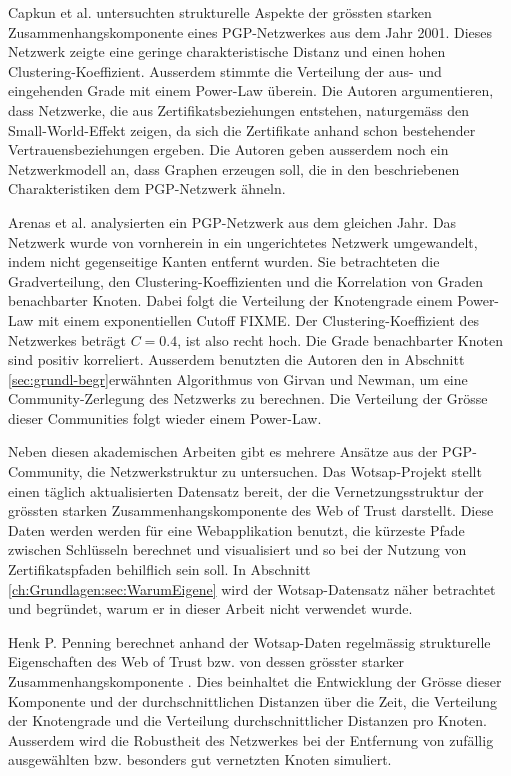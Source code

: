 Capkun et al. \cite{Capkun2002} untersuchten strukturelle Aspekte der
gr\"ossten starken Zusammenhangskomponente eines PGP-Netzwerkes aus
dem Jahr 2001. Dieses Netzwerk zeigte eine geringe charakteristische
Distanz und einen hohen Clustering-Koeffizient. Ausserdem stimmte die
Verteilung der aus- und eingehenden Grade mit einem Power-Law
\"uberein. Die Autoren argumentieren, dass Netzwerke, die aus
Zertifikatsbeziehungen entstehen, naturgem\"ass den Small-World-Effekt
zeigen, da sich die Zertifikate anhand schon bestehender
Vertrauensbeziehungen ergeben. Die Autoren geben ausserdem noch ein
Netzwerkmodell an, dass Graphen erzeugen soll, die in den
beschriebenen Charakteristiken dem PGP-Netzwerk \"ahneln.

Arenas et al. \cite{Boguna2004} analysierten ein PGP-Netzwerk aus dem
gleichen Jahr. Das Netzwerk wurde von vornherein in ein ungerichtetes
Netzwerk umgewandelt, indem nicht gegenseitige Kanten entfernt
wurden. Sie betrachteten die Gradverteilung, den
Clustering-Koeffizienten und die Korrelation von Graden benachbarter
Knoten. Dabei folgt die Verteilung der Knotengrade einem Power-Law mit
einem exponentiellen Cutoff FIXME. Der Clustering-Koeffizient des
Netzwerkes betr\"agt $C=0.4$, ist also recht hoch. Die Grade
benachbarter Knoten sind positiv korreliert. Ausserdem benutzten die
Autoren den in Abschnitt \ref{sec:grundl-begr}erw\"ahnten Algorithmus
von Girvan und Newman, um eine Community-Zerlegung des Netzwerks zu
berechnen. Die Verteilung der Gr\"osse dieser Communities folgt wieder
einem Power-Law.

Neben diesen akademischen Arbeiten gibt es mehrere Ans\"atze aus der
PGP-Community, die Netzwerkstruktur zu untersuchen. Das
Wotsap-Projekt\cite{Cederlof} stellt einen t\"aglich aktualisierten
Datensatz bereit, der die Vernetzungsstruktur der gr\"ossten starken
Zusammenhangskomponente des Web of Trust darstellt. Diese Daten werden
werden f\"ur eine Webapplikation benutzt, die k\"urzeste Pfade
zwischen Schl\"usseln berechnet und visualisiert und so bei der
Nutzung von Zertifikatspfaden behilflich sein soll. In Abschnitt
\ref{ch:Grundlagen:sec:WarumEigene} wird der Wotsap-Datensatz n\"aher
betrachtet und begr\"undet, warum er in dieser Arbeit nicht verwendet
wurde. 

Henk P. Penning berechnet anhand der Wotsap-Daten regelm\"assig
strukturelle Eigenschaften des Web of Trust bzw. von dessen gr\"osster
starker Zusammenhangskomponente \cite{Penning}. Dies beinhaltet die
Entwicklung der Gr\"osse dieser Komponente und der durchschnittlichen
Distanzen \"uber die Zeit, die Verteilung der Knotengrade und die
Verteilung durchschnittlicher Distanzen pro Knoten. Ausserdem wird die
Robustheit des Netzwerkes bei der Entfernung von zuf\"allig
ausgew\"ahlten bzw. besonders gut vernetzten Knoten simuliert.

